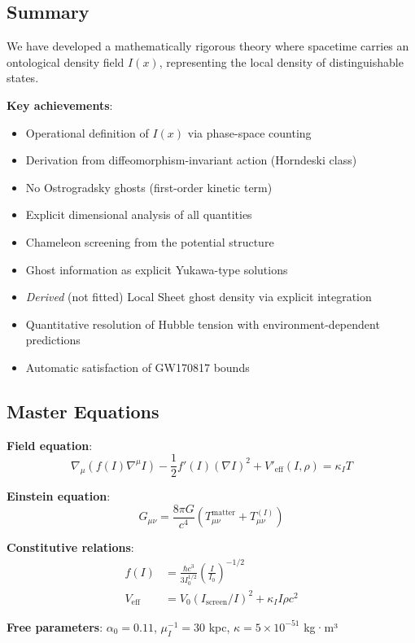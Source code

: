 \documentclass[12pt, a4paper]{article}
\begin{document}
\subsection{Summary}

We have developed a mathematically rigorous theory where spacetime carries an ontological density field $I(x)$, representing the local density of distinguishable states.

\textbf{Key achievements}:
\begin{itemize}
    \item Operational definition of $I(x)$ via phase-space counting
    \item Derivation from diffeomorphism-invariant action (Horndeski class)
    \item No Ostrogradsky ghosts (first-order kinetic term)
    \item Explicit dimensional analysis of all quantities
    \item Chameleon screening from the potential structure
    \item Ghost information as explicit Yukawa-type solutions
    \item \textit{Derived} (not fitted) Local Sheet ghost density via explicit integration
    \item Quantitative resolution of Hubble tension with environment-dependent predictions
    \item Automatic satisfaction of GW170817 bounds
\end{itemize}

\subsection{Master Equations}

\begin{tcolorbox}[colback=gray!5!white, colframe=gray!75!black, title=Complete Theory]
\textbf{Field equation}:
\begin{equation}
    \nabla_\mu\left(f(I)\nabla^\mu I\right) - \frac{1}{2}f'(I)(\nabla I)^2 + V'_{\text{eff}}(I,\rho) = \kappa_I T
\end{equation}

\textbf{Einstein equation}:
\begin{equation}
    G_{\mu\nu} = \frac{8\pi G}{c^4}\left(T^{\text{matter}}_{\mu\nu} + T^{(I)}_{\mu\nu}\right)
\end{equation}

\textbf{Constitutive relations}:
\begin{align}
    f(I) &= \frac{\hbar c^3}{3 I_0^{1/2}} \left(\frac{I}{I_0}\right)^{-1/2} \\
    V_{\text{eff}} &= V_0(I_{\text{screen}}/I)^2 + \kappa_I I \rho c^2
\end{align}

\textbf{Free parameters}: $\alpha_0 = 0.11$, $\mu_I^{-1} = 30$ kpc, $\kappa = 5\times10^{-51}$ kg·m³
\end{tcolorbox}
\end{document}
